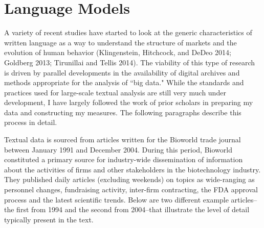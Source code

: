 \section{Language Models}

A variety of recent studies have started to look at the generic characteristics of written language as a way to understand the structure of markets and the evolution of human behavior (Klingenstein, Hitchcock, and DeDeo 2014; Goldberg 2013; Tirunillai and Tellis 2014). The viability of this type of research is driven by parallel developments in the availability of digital archives and methods appropriate for the analysis of ``big data." While the standards and practices used for large-scale textual analysis are still very much under development, I have largely followed the work of prior scholars in preparing my data and constructing my measures. The following paragraphs describe this process in detail.

Textual data is sourced from articles written for the Bioworld trade journal between January 1991 and December 2004. During this period, Bioworld constituted a primary source for industry-wide dissemination of information about the activities of firms and other stakeholders in the biotechnology industry. They published daily articles (excluding weekends) on topics as wide-ranging as personnel changes, fundraising activity, inter-firm contracting, the FDA approval process and the latest scientific trends. Below are two different example articles--the first from 1994 and the second from 2004--that illustrate the level of detail typically present in the text.

